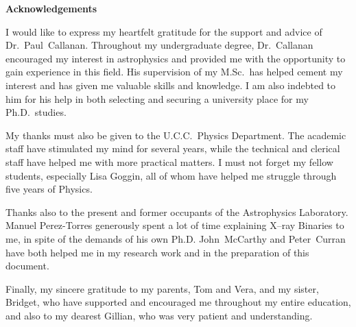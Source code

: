 
\begin{center}
\Large{\textbf{Acknowledgements}}
\end{center}

\vspace{\myparskip}

I would like to express my heartfelt gratitude for the support and
advice of Dr.~Paul~Callanan. Throughout my undergraduate degree,
Dr.~Callanan encouraged my interest in astrophysics and provided me
with the opportunity to gain experience in this field. His supervision
of my M.Sc.\ has helped cement my interest and has given me valuable
skills and knowledge. I am also indebted to him for his help in both
selecting and securing a university place for my Ph.D.\ studies. %

\vspace{\myparskip}

My thanks must also be given to the U.C.C.\ Physics Department. The
academic staff have stimulated my mind for several years, while the
technical and clerical staff have helped me with more practical
matters. I must not forget my fellow students, especially Lisa Goggin,
all of whom have helped me struggle through five years of Physics. %

\vspace{\myparskip}

Thanks also to the present and former occupants of the Astrophysics
Laboratory. Manuel Perez-Torres generously spent a lot of time
explaining X--ray Binaries to me, in spite of the demands of his own
Ph.D. John~McCarthy and Peter~Curran have both helped
me in my research work and in the preparation of this document. %

\vspace{\myparskip}

Finally, my sincere gratitude to my parents, Tom and Vera, and my
sister, Bridget, who have supported and encouraged me throughout my
entire education, and also to my dearest Gillian, who was very
patient and understanding. %

